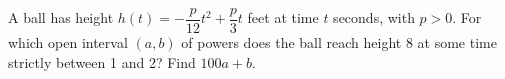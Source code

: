 A ball has height $h(t)=-\dfrac{p}{12}t^2+\dfrac{p}{3}t$ feet at time $t$ seconds, with $p>0$. For which open interval $(a,b)$ of powers does the ball reach height 8 at some time strictly between 1 and 2? Find $100a+b$.
